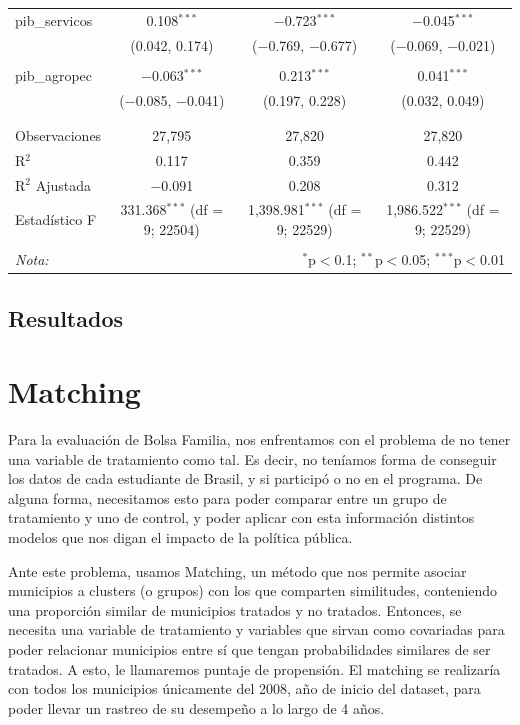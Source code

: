 \documentclass[
]{article}
\begin{document}
\begin{table}[!htbp]
\begin{tabular}{@{\extracolsep{5pt}}lccc}
 pib\_servicos & 0.108$^{***}$ & $-$0.723$^{***}$ & $-$0.045$^{***}$ \\ 
  & (0.042, 0.174) & ($-$0.769, $-$0.677) & ($-$0.069, $-$0.021) \\ 
  & & & \\ 
 pib\_agropec & $-$0.063$^{***}$ & 0.213$^{***}$ & 0.041$^{***}$ \\ 
  & ($-$0.085, $-$0.041) & (0.197, 0.228) & (0.032, 0.049) \\ 
  & & & \\ 
\hline \\[-1.8ex] 
Observaciones & 27,795 & 27,820 & 27,820 \\ 
R$^{2}$ & 0.117 & 0.359 & 0.442 \\ 
R$^{2}$ Ajustada & $-$0.091 & 0.208 & 0.312 \\ 
Estadístico F & 331.368$^{***}$ (df = 9; 22504) & 1,398.981$^{***}$ (df = 9; 22529) & 1,986.522$^{***}$ (df = 9; 22529) \\ 
\hline 
\hline \\[-1.8ex] 
\textit{Nota:}  & \multicolumn{3}{r}{$^{*}$p$<$0.1; $^{**}$p$<$0.05; $^{***}$p$<$0.01} \\ 
\end{tabular} 
\end{table}

\hypertarget{resultados}{%
\subsection{Resultados}\label{resultados}}

\newpage

\hypertarget{matching}{%
\section{Matching}\label{matching}}

Para la evaluación de Bolsa Familia, nos enfrentamos con el problema de
no tener una variable de tratamiento como tal. Es decir, no teníamos
forma de conseguir los datos de cada estudiante de Brasil, y si
participó o no en el programa. De alguna forma, necesitamos esto para
poder comparar entre un grupo de tratamiento y uno de control, y poder
aplicar con esta información distintos modelos que nos digan el impacto
de la política pública.

Ante este problema, usamos Matching, un método que nos permite asociar
municipios a clusters (o grupos) con los que comparten similitudes,
conteniendo una proporción similar de municipios tratados y no tratados.
Entonces, se necesita una variable de tratamiento y variables que sirvan
como covariadas para poder relacionar municipios entre sí que tengan
probabilidades similares de ser tratados. A esto, le llamaremos puntaje
de propensión. El matching se realizaría con todos los municipios
únicamente del 2008, año de inicio del dataset, para poder llevar un
rastreo de su desempeño a lo largo de 4 años.
\end{document}

